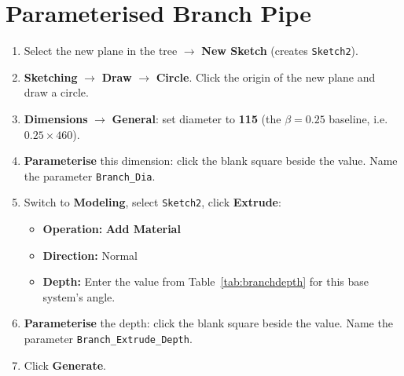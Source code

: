 \documentclass[12pt,a4paper]{report}
\begin{document}
\medskip
\noindent{}


\section{Parameterised Branch Pipe}

\begin{enumerate}
  \item Select the new plane in the tree $\rightarrow$ \textbf{New Sketch}
        (creates \texttt{Sketch2}).
  \item \textbf{Sketching} $\rightarrow$ \textbf{Draw} $\rightarrow$
        \textbf{Circle}.  Click the origin of the new plane and draw a circle.
  \item \textbf{Dimensions} $\rightarrow$ \textbf{General}: set diameter to
        \textbf{115} (the $\beta = 0.25$ baseline, i.e.\ $0.25 \times 460$).
  \item \textbf{Parameterise} this dimension: click the blank square beside
        the value.  Name the parameter \texttt{Branch\_Dia}.
  \item Switch to \textbf{Modeling}, select \texttt{Sketch2}, click
        \textbf{Extrude}:
  \begin{itemize}
    \item \textbf{Operation:} \textbf{Add Material}
    \item \textbf{Direction:} Normal
    \item \textbf{Depth:} Enter the value from Table~\ref{tab:branchdepth}
          for this base system's angle.
  \end{itemize}
  \item \textbf{Parameterise} the depth: click the blank square beside the
        value.  Name the parameter \texttt{Branch\_Extrude\_Depth}.
  \item Click \textbf{Generate}.
\end{enumerate}
\end{document}
